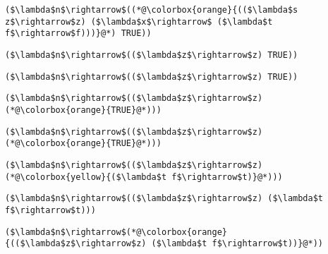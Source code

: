 \documentclass{beamer}
\begin{document}
\begin{frame}[fragile]{\CurrentSection}
\lstset{basicstyle=\ttfamily\small}\lstset{numbers=none}\lstset{language=ML}\begin{lstlisting}
($\lambda$n$\rightarrow$((*@\colorbox{orange}{(($\lambda$s z$\rightarrow$z) ($\lambda$x$\rightarrow$ ($\lambda$t f$\rightarrow$f)))}@*) TRUE))
\end{lstlisting}
\pause\lstset{language=ML}\begin{lstlisting}
($\lambda$n$\rightarrow$(($\lambda$z$\rightarrow$z) TRUE))
\end{lstlisting}

\end{frame}

\begin{frame}[fragile]{\CurrentSection}
\lstset{basicstyle=\ttfamily\small}\lstset{numbers=none}\lstset{language=ML}\begin{lstlisting}
($\lambda$n$\rightarrow$(($\lambda$z$\rightarrow$z) TRUE))
\end{lstlisting}
\pause\lstset{language=ML}\begin{lstlisting}
($\lambda$n$\rightarrow$(($\lambda$z$\rightarrow$z) (*@\colorbox{orange}{TRUE}@*)))
\end{lstlisting}

\end{frame}

\begin{frame}[fragile]{\CurrentSection}
\lstset{basicstyle=\ttfamily\small}\lstset{numbers=none}\lstset{language=ML}\begin{lstlisting}
($\lambda$n$\rightarrow$(($\lambda$z$\rightarrow$z) (*@\colorbox{orange}{TRUE}@*)))
\end{lstlisting}
\pause\lstset{language=ML}\begin{lstlisting}
($\lambda$n$\rightarrow$(($\lambda$z$\rightarrow$z) (*@\colorbox{yellow}{($\lambda$t f$\rightarrow$t)}@*)))
\end{lstlisting}

\end{frame}

\begin{frame}[fragile]{\CurrentSection}
\lstset{basicstyle=\ttfamily\small}\lstset{numbers=none}\lstset{language=ML}\begin{lstlisting}
($\lambda$n$\rightarrow$(($\lambda$z$\rightarrow$z) ($\lambda$t f$\rightarrow$t)))
\end{lstlisting}
\pause\lstset{language=ML}\begin{lstlisting}
($\lambda$n$\rightarrow$(*@\colorbox{orange}{(($\lambda$z$\rightarrow$z) ($\lambda$t f$\rightarrow$t))}@*))
\end{lstlisting}

\end{frame}
\end{document}
